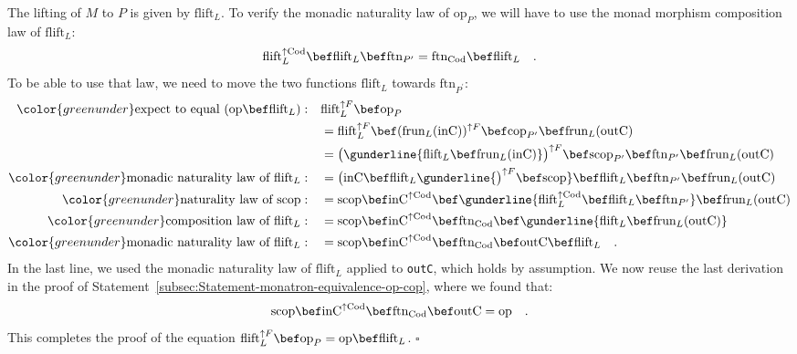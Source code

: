 The lifting of $M$ to $P$ is given by $\text{flift}_{L}$. To verify
the monadic naturality law of $\text{op}_{P}$, we will have to use
the monad morphism composition law of $\text{flift}_{L}$:
\[
\text{flift}_{L}^{\uparrow\text{Cod}}\bef\text{flift}_{L}\bef\text{ftn}_{P^{\prime}}=\text{ftn}_{\text{Cod}}\bef\text{flift}_{L}\quad.
\]
To be able to use that law, we need to move the two functions $\text{flift}_{L}$
towards $\text{ftn}_{P^{\prime}}$:
\begin{align*}
{\color{greenunder}\text{expect to equal }(\text{op}\bef\text{flift}_{L}):}\quad & \text{flift}_{L}^{\uparrow F}\bef\text{op}_{P}\\
 & =\text{flift}_{L}^{\uparrow F}\bef(\text{frun}_{L}(\text{inC}))^{\uparrow F}\bef\text{cop}_{P^{\prime}}\bef\text{frun}_{L}(\text{outC})\\
 & =\big(\gunderline{\text{flift}_{L}\bef\text{frun}_{L}(\text{inC})}\big)^{\uparrow F}\bef\text{scop}_{P^{\prime}}\bef\text{ftn}_{P^{\prime}}\bef\text{frun}_{L}(\text{outC})\\
{\color{greenunder}\text{monadic naturality law of }\text{flift}_{L}:}\quad & =\big(\text{inC}\bef\text{flift}_{L}\gunderline{\big)^{\uparrow F}\bef\text{scop}}\bef\text{flift}_{L}\bef\text{ftn}_{P^{\prime}}\bef\text{frun}_{L}(\text{outC})\\
{\color{greenunder}\text{naturality law of }\text{scop}:}\quad & =\text{scop}\bef\text{inC}^{\uparrow\text{Cod}}\bef\gunderline{\text{flift}_{L}^{\uparrow\text{Cod}}\bef\text{flift}_{L}\bef\text{ftn}_{P^{\prime}}}\bef\text{frun}_{L}(\text{outC})\\
{\color{greenunder}\text{composition law of }\text{flift}_{L}:}\quad & =\text{scop}\bef\text{inC}^{\uparrow\text{Cod}}\bef\text{ftn}_{\text{Cod}}\bef\gunderline{\text{flift}_{L}\bef\text{frun}_{L}(\text{outC})}\\
{\color{greenunder}\text{monadic naturality law of }\text{flift}_{L}:}\quad & =\text{scop}\bef\text{inC}^{\uparrow\text{Cod}}\bef\text{ftn}_{\text{Cod}}\bef\text{outC}\bef\text{flift}_{L}\quad.
\end{align*}
In the last line, we used the monadic naturality law of $\text{flift}_{L}$
applied to \lstinline!outC!, which holds by assumption. We now reuse
the last derivation in the proof of Statement~\ref{subsec:Statement-monatron-equivalence-op-cop},
where we found that:
\[
\text{scop}\bef\text{inC}^{\uparrow\text{Cod}}\bef\text{ftn}_{\text{Cod}}\bef\text{outC}=\text{op}\quad.
\]
This completes the proof of the equation $\text{flift}_{L}^{\uparrow F}\bef\text{op}_{P}=\text{op}\bef\text{flift}_{L}$.
$\square$

